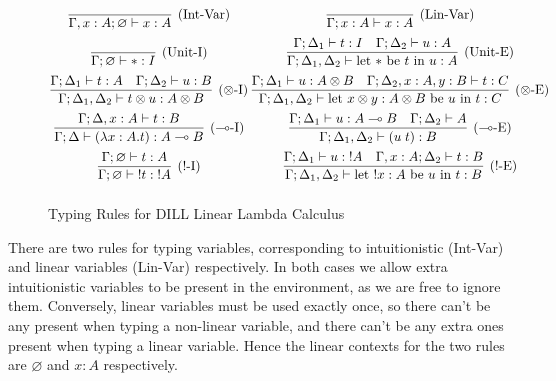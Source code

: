 \documentclass[]{unswthesis}
\let\emptyset\varnothing
\newcommand{\types}{\vdash}
\newcommand{\lolly}{\multimap}
\newcommand{\letbe}[3]{\text{let $#1$ be $#2$ in $#3$}}
\let\b\textbf
\begin{document}
\begin{figure}[h]
\caption{Typing Rules for DILL Linear Lambda Calculus}
\begin{displaymath}
\arraycolsep=1.4pt\def\arraystretch{2.2}
\begin{array}{cc}
\infer[\text{(Int-Var)}]{\Gamma, x : A; \emptyset \types x : A}{} &
\infer[\text{(Lin-Var)}]{\Gamma; x : A \types x : A}{} \\
\infer[\text{(Unit-I)}]{\Gamma; \emptyset \types * : I}{} &
\infer[\text{(Unit-E)}]
  {\Gamma; \Delta_1, \Delta_2 \types \letbe{*}{t}{u} : A}
  {\Gamma; \Delta_1 \types t : I  &  \Gamma; \Delta_2 \types u : A} \\
\infer[\text{($\otimes$-I)}]
  {\Gamma; \Delta_1, \Delta_2 \types t \otimes u : A \otimes B}
  {\Gamma; \Delta_1 \types t : A  &  \Gamma; \Delta_2 \types u : B} &
\infer[\text{($\otimes$-E)}]
  {\Gamma; \Delta_1, \Delta_2 \types \letbe{x \otimes y : A \otimes B}{u}{t} : C}
  {\Gamma; \Delta_1 \types u : A \otimes B  &  \Gamma; \Delta_2, x : A, y : B \types t : C} \\
\infer[\text{($\lolly$-I)}]
  {\Gamma; \Delta \types (\lambda x : A. t) : A \lolly B}
  {\Gamma; \Delta, x : A \types t : B} &
\infer[\text{($\lolly$-E)}]
  {\Gamma; \Delta_1, \Delta_2 \types (u \; t) : B}
  {\Gamma; \Delta_1 \types u : A \lolly B  &  \Gamma; \Delta_2 \types A} \\
\infer[\text{(!-I)}]
  {\Gamma; \emptyset \types {!t} : {!A}}
  {\Gamma; \emptyset \types t : A} &
\infer[\text{(!-E)}]
  {\Gamma; \Delta_1, \Delta_2 \types \letbe{!x : A}{u}{t} : B}
  {\Gamma; \Delta_1 \types u : {!A}  &  \Gamma, x : A; \Delta_2 \types t : B} \\
\end{array}
\end{displaymath}
\end{figure}

There are two rules for typing variables, corresponding to intuitionistic (Int-Var) and linear variables (Lin-Var) respectively. In both cases we allow extra intuitionistic variables to be present in the environment, as we are free to ignore them. Conversely, linear variables must be used exactly once, so there can't be any present when typing a non-linear variable, and there can't be any extra ones present when typing a linear variable. Hence the linear contexts for the two rules are $\emptyset$ and $x : A$ respectively.

\end{document}
